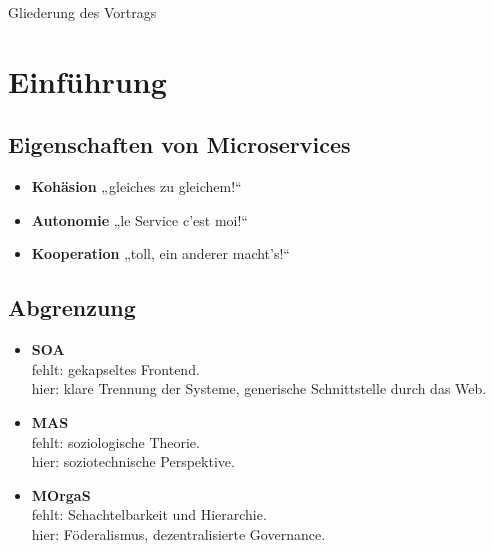 \documentclass{beamer}
\date{16. Januar 2016}
\def\tocname{Gliederung des Vortrags}
\begin{document}
\fontsize{14pt}{14pt}
	
{
\begin{frame}%
	\titlepage
\end{frame}}

\begin{frame}{\tocname}
	\tableofcontents
\end{frame}

\section{Einführung}

\subsection{Eigenschaften von Microservices}
\begin{frame}{\insertsubsection}
	\begin{itemize}
		\setlength\itemsep{2em}
		\item \textbf{Kohäsion} „gleiches zu gleichem!“
		\item \textbf{Autonomie} „le Service c'est moi!“
		\item \textbf{Kooperation} „toll, ein anderer macht's!“
	\end{itemize}
\end{frame}

\subsection{Abgrenzung}
\begin{frame}{\insertsubsection}
	\begin{itemize}
		\item \textbf{SOA}\\
		fehlt: gekapseltes Frontend.\\
		hier: klare Trennung der Systeme, generische Schnittstelle durch das Web.
		
		\item \textbf{MAS}\\
		fehlt: soziologische Theorie.\\
		hier: soziotechnische Perspektive.
		
		\item \textbf{MOrgaS} \cite{Wester-Ebbinghaus10} \\
		fehlt: Schachtelbarkeit und Hierarchie.\\
		hier: Föderalismus, dezentralisierte Governance.
	\end{itemize}
\end{frame}
\end{document}
